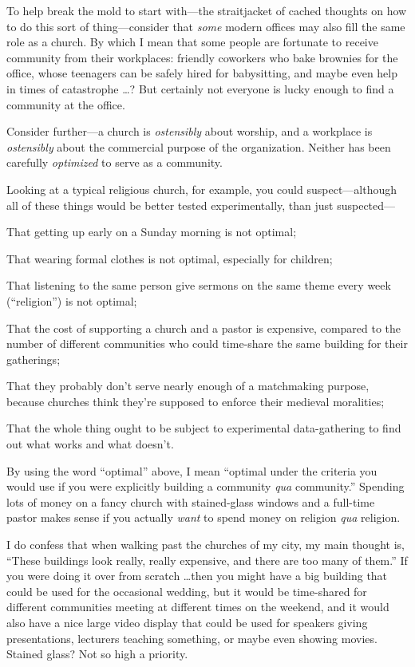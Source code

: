 {
 To help break the mold to start with---the straitjacket of cached
thoughts on how to do this sort of thing---consider that \textit{some}
modern offices may also fill the same role as a church. By which I mean
that some people are fortunate to receive community from their
workplaces: friendly coworkers who bake brownies for the office, whose
teenagers can be safely hired for babysitting, and maybe even help in
times of catastrophe \ldots ? But certainly not everyone is lucky enough
to find a community at the office.}

{
 Consider further---a church is \textit{ostensibly} about worship,
and a workplace is \textit{ostensibly} about the commercial purpose of
the organization. Neither has been carefully \textit{optimized} to
serve as a community.}

{
 Looking at a typical religious church, for example, you could
suspect---although all of these things would be better tested
experimentally, than just suspected---}

{
 That getting up early on a Sunday morning is not optimal;}

{
 That wearing formal clothes is not optimal, especially for
children;}

{
 That listening to the same person give sermons on the same theme
every week (``religion'') is not
optimal;}

{
 That the cost of supporting a church and a pastor is expensive,
compared to the number of different communities who could time-share
the same building for their gatherings;}

{
 That they probably don't serve nearly enough of a
matchmaking purpose, because churches think they're
supposed to enforce their medieval moralities;}

{
 That the whole thing ought to be subject to experimental
data-gathering to find out what works and what
doesn't.}

{
 By using the word ``optimal''
above, I mean ``optimal under the criteria you would
use if you were explicitly building a community \textit{qua}
community.'' Spending lots of money on a fancy church
with stained-glass windows and a full-time pastor makes sense if you
actually \textit{want} to spend money on religion \textit{qua}
religion.}

{
 I do confess that when walking past the churches of my city, my
main thought is, ``These buildings look really, really
expensive, and there are too many of them.'' If you
were doing it over from scratch \ldots then you might have a big
building that could be used for the occasional wedding, but it would be
time-shared for different communities meeting at different times on the
weekend, and it would also have a nice large video display that could
be used for speakers giving presentations, lecturers teaching
something, or maybe even showing movies. Stained glass? Not so high a
priority.}

